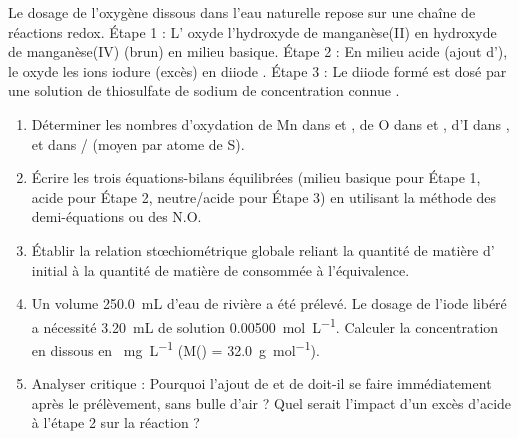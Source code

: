 \documentclass[11pt]{article}
\begin{document}
\begin{exercice}
Le dosage de l'oxygène dissous  dans l'eau naturelle repose sur une chaîne de réactions redox. 
Étape 1 : L' oxyde l'hydroxyde de manganèse(II)  en hydroxyde de manganèse(IV)  (brun) en milieu basique.
Étape 2 : En milieu acide (ajout d'), le  oxyde les ions iodure  (excès) en diiode .
Étape 3 : Le diiode formé est dosé par une solution de thiosulfate de sodium  de concentration connue .
\begin{enumerate}
    \item Déterminer les nombres d'oxydation de Mn dans  et , de O dans  et , d'I dans ,  et dans  /  (moyen par atome de S).
    \item Écrire les trois équations-bilans équilibrées (milieu basique pour Étape 1, acide pour Étape 2, neutre/acide pour Étape 3) en utilisant la méthode des demi-équations ou des N.O.
    \item Établir la relation stœchiométrique globale reliant la quantité de matière d' initial à la quantité de matière de  consommée à l'équivalence.
    \item Un volume \SI{250.0}{\milli\liter} d'eau de rivière a été prélevé. Le dosage de l'iode libéré a nécessité \SI{3.20}{\milli\liter} de solution  \SI{0.00500}{\mol\per\liter}. Calculer la concentration en  dissous en \SI{}{\milli\gram\per\liter} (M() = \SI{32.0}{\gram\per\mol}).
    \item Analyser critique : Pourquoi l'ajout de  et de  doit-il se faire immédiatement après le prélèvement, sans bulle d'air ? Quel serait l'impact d'un excès d'acide à l'étape 2 sur la réaction  ?
\end{enumerate}
\end{exercice}
\end{document}

